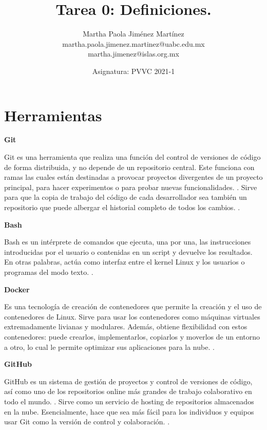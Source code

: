 \documentclass[12pt,letterpaper]{article}
\begin{document}
\title{\textbf{Tarea 0: 
Definiciones.}}
\author{Martha Paola Jim\'enez Mart\'inez \\
\small{martha.paola.jimenez.martinez@uabc.edu.mx} \\
\small{martha.jimenez@islas.org.mx}}
\date{ \small{Asignatura: PVVC 2021-1}
} 
\maketitle

\section{Herramientas}
\item\textbf{Git}
\item Git es una herramienta que realiza una funci\'on del control de versiones de c\'odigo de forma distribuida, y no depende de un repositorio central.
Este funciona con ramas las cuales est\'an destinadas a provocar proyectos divergentes de un proyecto principal, para hacer experimentos o para probar nuevas funcionalidades.
 \cite[( Rubio, J. 2020)]{ref1}.
Sirve para que la copia de trabajo del c\'odigo de cada desarrollador sea tambi\'en un repositorio que puede albergar el historial completo de todos los cambios.
 \cite[(Bitbucket. s.f.)]{ref2}.

\item\textbf{Bash}
\item Bash es un int\'erprete de comandos que ejecuta, una por una, las instrucciones introducidas por el usuario o contenidas en un script y devuelve los resultados. En otras palabras, act\'ua como interfaz entre el kernel Linux y los usuarios o programas del modo texto.
 \cite[(Canepa, G. 2018)]{ref3}.

\item\textbf{Docker}
\item Es una tecnolog\'ia de creación de contenedores que permite la creaci\'on y el uso de contenedores de Linux.
Sirve para usar los contenedores como m\'aquinas virtuales extremadamente livianas y modulares. Adem\'as, obtiene flexibilidad con estos contenedores: puede crearlos, implementarlos, copiarlos y moverlos de un entorno a otro, lo cual le permite optimizar sus aplicaciones para la nube.
 \cite[( RedHat. s.f.)]{ref4}.

\item\textbf{GitHub}
\item GitHub es un sistema de gesti\'on de proyectos y control de versiones de c\'odigo, as\'i como uno de los repositorios online m\'as grandes de trabajo colaborativo en todo el mundo.
 \cite[(Hostinger Tutoriales. 2019)]{ref5}.
Sirve como un servicio de hosting de repositorios almacenados en la nube. Esencialmente, hace que sea m\'as f\'acil para los individuos y equipos usar Git como la versi\'on de control y colaboraci\'on.
\cite[(Kinsta. 2020)]{ref6}.
\end{document}
